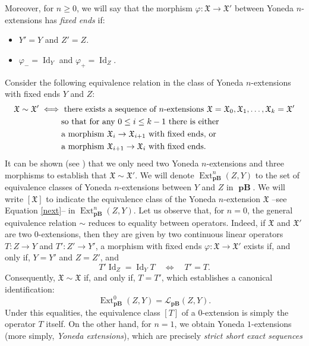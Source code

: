 \documentclass[12pt,a4paper]{amsproc}
\theoremstyle{remark}
\theoremstyle{definition}
\newcommand{\Ext}{\operatorname{Ext}}
\newcommand{\pBan}{\operatorname{\textbf{pB}}}
\newcommand{\Id}{\operatorname{Id}}
\numberwithin{equation}{section}
\begin{document}
\par Moreover, for $n \geq 0$, we will say that the morphism $\varphi: \mathfrak{X} \to \mathfrak{X}'$ between Yoneda $n$-extensions has \emph{fixed ends} if:
	\begin{itemize}
		\item[(i)] $Y'=Y$ and $Z'=Z$.
		\item[(ii)] $\varphi_-=\Id_Y$ and $\varphi_+=\Id_Z$.
	\end{itemize} 
	Consider the following equivalence relation in the class of Yoneda $n$-extensions with fixed ends $Y$ and $Z$:
	\begin{equation}
		\notag
		\begin{split}
			\mathfrak{X} \sim \mathfrak{X}' \iff & \text{ there exists a sequence of } n\text{-extensions } \mathfrak{X}=\mathfrak{X}_0, \mathfrak{X}_1, \ldots, \mathfrak{X}_k=\mathfrak{X}'\\
			& \text{so that for any }  0 \leq i \leq k-1 \text{ there is either }\\
			& \text{a morphism } \mathfrak{X}_i \to \mathfrak{X}_{i+1} \text{ with } \text{fixed ends, or }\\
			& \text{a morphism } \mathfrak{X}_{i+1} \to \mathfrak{X}_{i} \text{ with fixed ends.}
		\end{split}
	\end{equation}
	It can be shown (see \cite[Corollary 6.4]{exact_categ}) that we only need two Yoneda $n$-extensions and three morphisms to establish that $\mathfrak{X} \sim \mathfrak{X}'$. We will denote $\Ext^n_{\boldsymbol{\pBan}}(Z,Y)$ to the set of equivalence classes of Yoneda $n$-extensions between $Y$ and $Z$ in $\boldsymbol{\pBan}$. We will write $\left[ \mathfrak{X} \right]$ to indicate the equivalence class of the Yoneda $n$-extension $\mathfrak{X}$ --see Equation \ref{next}-- in $\Ext^n_{\boldsymbol{\pBan}}(Z,Y)$.
	Let us observe that, for $n=0$, the general equivalence relation $\sim$ reduces to equality between operators. Indeed, if $\mathfrak{X}$ and $\mathfrak{X}'$ are two $0$-extensions, then they are given by two continuous linear operators $T:Z \to Y$ and $T':Z' \to Y'$, a morphism with fixed ends $\varphi: \mathfrak{X} \to \mathfrak{X}'$ exists if, and only if, $Y=Y'$ and $Z=Z'$, and
\[
T' \Id_Z = \Id_Y T \quad \iff \quad T' = T.
\]
Consequently, $\mathfrak{X} \sim \mathfrak{X}$ if, and only if, $ T = T'$, which establishes a canonical identification:
\[
\Ext^0_{\boldsymbol{\pBan}}(Z,Y) = \mathcal{L}_{\pBan}(Z,Y).
\]
Under this equalities, the equivalence class $[T]$ of a $0$-extension is simply the operator $T$ itself. On the other hand, for $n=1$, we obtain Yoneda $1$-extensions (more simply, \emph{Yoneda extensions}), which are precisely \emph{strict short exact sequences}
\end{document}

